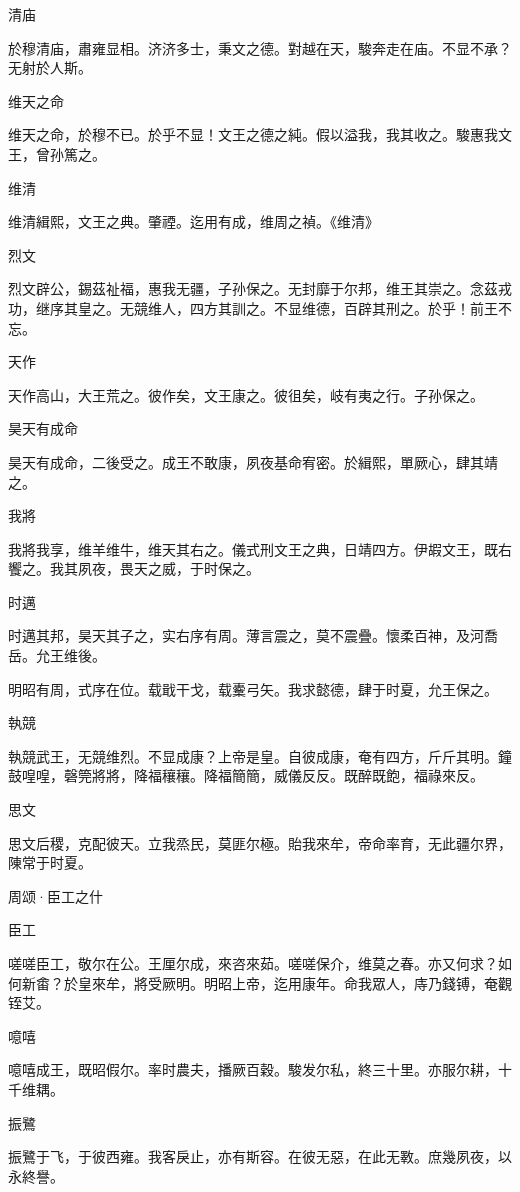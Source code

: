 清庙

於穆清庙，肅雍显相。济济多士，秉文之德。對越在天，駿奔走在庙。不显不承？无射於人斯。

维天之命

维天之命，於穆不已。於乎不显！文王之德之純。假以溢我，我其收之。駿惠我文王，曾孙篤之。

维清

维清緝熙，文王之典。肇禋。迄用有成，维周之禎。《维清》

烈文

烈文辟公，錫茲祉福，惠我无疆，子孙保之。无封靡于尔邦，维王其崇之。念茲戎功，继序其皇之。无競维人，四方其訓之。不显维德，百辟其刑之。於乎！前王不忘。

天作

天作高山，大王荒之。彼作矣，文王康之。彼徂矣，岐有夷之行。子孙保之。

昊天有成命

昊天有成命，二後受之。成王不敢康，夙夜基命宥密。於緝熙，單厥心，肆其靖之。

我將

我將我享，维羊维牛，维天其右之。儀式刑文王之典，日靖四方。伊嘏文王，既右饗之。我其夙夜，畏天之威，于时保之。

时邁

时邁其邦，昊天其子之，实右序有周。薄言震之，莫不震疊。懷柔百神，及河喬岳。允王维後。

明昭有周，式序在位。载戢干戈，载櫜弓矢。我求懿德，肆于时夏，允王保之。

執競

執競武王，无競维烈。不显成康？上帝是皇。自彼成康，奄有四方，斤斤其明。鐘鼓喤喤，磬筦將將，降福穰穰。降福簡簡，威儀反反。既醉既飽，福祿來反。

思文

思文后稷，克配彼天。立我烝民，莫匪尔極。貽我來牟，帝命率育，无此疆尔界，陳常于时夏。




周颂·臣工之什


臣工

嗟嗟臣工，敬尔在公。王厘尔成，來咨來茹。嗟嗟保介，维莫之春。亦又何求？如何新畬？於皇來牟，將受厥明。明昭上帝，迄用康年。命我眾人，庤乃錢镈，奄觀铚艾。

噫嘻

噫嘻成王，既昭假尔。率时農夫，播厥百穀。駿发尔私，終三十里。亦服尔耕，十千维耦。

振鷺

振鷺于飞，于彼西雍。我客戾止，亦有斯容。在彼无惡，在此无斁。庶幾夙夜，以永終譽。

